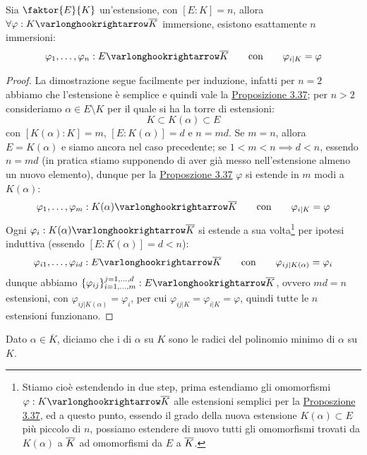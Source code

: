 \documentclass[11pt]{scrartcl}
\begin{document}
\pagebreak

\begin{corollary}
    \label{3.39}
    Sia $\faktor{E}{K}$ un'estensione, con $[E:K] = n$, allora $\forall \varphi : K \varlonghookrightarrow \overline K$ immersione, esistono esattamente $n$ immersioni:
    \[ \varphi_1,\ldots,\varphi_n : E \varlonghookrightarrow \overline K \qquad \text{con} \qquad \varphi_{i|K} = \varphi
        \]
\end{corollary}

\begin{proof}
    La dimostrazione segue facilmente per induzione, infatti per $n = 2$ abbiamo che l'estensione è semplice e quindi vale la \hyperref[3.37]{Proposizione 3.37}; per $n>2$ consideriamo
    $\alpha \in E \setminus K$ per il quale si ha la torre di estensioni:
    \[ K \subset K(\alpha) \subset E
        \]
    con $[K(\alpha) : K] = m$, $[E : K(\alpha)] = d$ e $n = md$. Se $m = n$, allora $E = K(\alpha)$ e siamo ancora nel caso precedente; se $1 < m < n \implies d < n$,
    essendo $n = md$ (in pratica stiamo supponendo di aver già messo nell'estensione almeno un nuovo elemento), dunque per la \hyperref[3.37]{Proposzione 3.37} $\varphi$ si estende in $m$ modi a $K(\alpha)$:
    \[ \varphi_1,\ldots,\varphi_m : K(\alpha) \varlonghookrightarrow \overline K \qquad \text{con} \qquad \varphi_{i|K} = \varphi
        \]
    Ogni $\varphi_i : K(\alpha) \varlonghookrightarrow \overline K$ si estende a sua volta\footnote{Stiamo cioè estendendo in due step, prima estendiamo gli omomorfismi $\varphi : K \varlonghookrightarrow \ol K$ alle estensioni semplici per la \hyperref[3.37]{Proposzione 3.37}, ed a questo punto, essendo il grado della nuova 
    estensione $K(\alpha) \subset E$ più piccolo di $n$, possiamo estendere di nuovo tutti gli omomorfismi trovati da $K(\alpha)$ a $\overline K$ ad omomorfismi da $E$ a $\overline K$.} per ipotesi induttiva (essendo $[E : K(\alpha)] = d < n$):
    \[ \varphi_{i1},\ldots,\varphi_{id} : E \varlonghookrightarrow \overline K \qquad \text{con} \qquad \varphi_{ij|K(\alpha)} = \varphi_i
        \]
    dunque abbiamo $\{\varphi_{ij}\}_{i = 1,\ldots,m}^{j = 1,\ldots,d} : E \varlonghookrightarrow \overline K$, ovvero $md = n$ estensioni, con $\varphi_{ij | K(\alpha)} = \varphi_i $, per cui $\varphi_{ij|K} = \varphi_{i | K} = \varphi$, quindi tutte le $n$ estensioni funzionano.
\end{proof}

\begin{definition}
    Dato $\alpha \in \overline K$, diciamo che i  di $\alpha$ su $K$ sono le radici del polinomio minimo di $\alpha$ su $K$. 
\end{definition}
\end{document}
